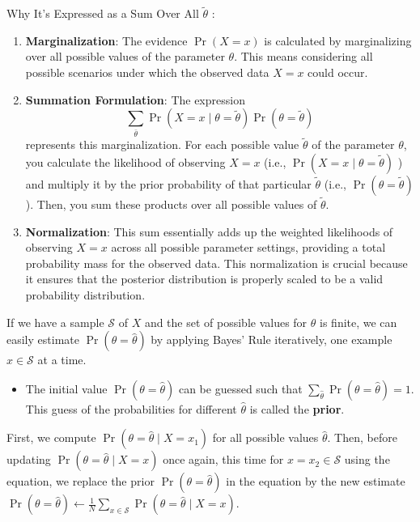 \documentclass[9pt,dvipsnames]{beamer}
\begin{document}
\begin{frame}{Why It's Expressed as a Sum Over All $\tilde{\theta}$ :}
	\begin{enumerate}
		\item \textbf{Marginalization}: The evidence $\operatorname{Pr}(X=x)$ is calculated by marginalizing over all possible values of the parameter $\theta$. This means considering all possible scenarios under which the observed data $X=x$ could occur.
		\item \textbf{Summation Formulation}: The expression
		      $$
			      \sum_{\bar{\theta}} \operatorname{Pr}(X=x \mid \theta=\tilde{\theta}) \operatorname{Pr}(\theta=\tilde{\theta})
		      $$
		      represents this marginalization. For each possible value $\tilde{\theta}$ of the parameter $\theta$, you calculate the likelihood of observing $X=x$ (i.e., $\operatorname{Pr}(X=x \mid \theta=\tilde{\theta})$ ) and multiply it by the prior probability of that particular $\tilde{\theta}$ (i.e., $\operatorname{Pr}(\theta=\tilde{\theta})$ ). Then, you sum these products over all possible values of $\tilde{\theta}$.
		\item \textbf{Normalization}: This sum essentially adds up the weighted likelihoods of observing $X=x$ across all possible parameter settings, providing a total probability mass for the observed data. This normalization is crucial because it ensures that the posterior distribution is properly scaled to be a valid probability distribution.
	\end{enumerate}
\end{frame}
\begin{frame}
	If we have a sample $\mathcal{S}$ of $X$ and the set of possible values for $\theta$ is finite, we can easily estimate $\operatorname{Pr}(\theta=\hat{\theta})$ by applying Bayes' Rule iteratively, one example $x \in \mathcal{S}$ at a time.
	\begin{itemize}
		\item The initial value $\operatorname{Pr}(\theta=\hat{\theta})$ can be guessed such that $\sum_{\hat{\theta}} \operatorname{Pr}(\theta=\hat{\theta})=1$. This guess of the probabilities for different $\hat{\theta}$ is called the \textbf{prior}.
	\end{itemize}
	First, we compute $\operatorname{Pr}(\theta=\hat{\theta} \mid X=x_{1})$ for all possible values $\hat{\theta}$. Then, before updating $\operatorname{Pr}(\theta=\hat{\theta} \mid X=x)$ once again, this time for $x=x_{2} \in \mathcal{S}$ using the equation, we replace the prior $\operatorname{Pr}(\theta=\hat{\theta})$ in the equation by the new estimate $\operatorname{Pr}(\theta=\hat{\theta}) \leftarrow \frac{1}{N} \sum_{x \in \mathcal{S}} \operatorname{Pr}(\theta=\hat{\theta} \mid X=x)$.
\end{frame}
\end{document}
